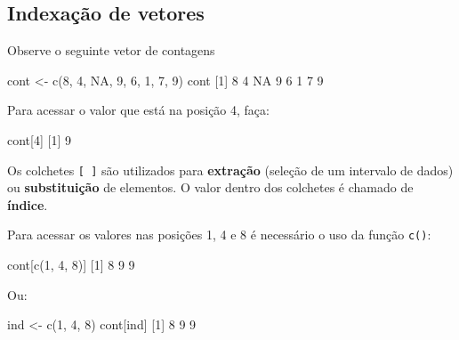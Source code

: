 \documentclass[
  10pt,
  a4paper]{book}
\newenvironment{Shaded}{\begin{snugshade}}{\end{snugshade}}
\newcommand{\ConstantTok}[1]{\textcolor[rgb]{0.00,0.00,0.00}{#1}}
\newcommand{\DecValTok}[1]{\textcolor[rgb]{0.00,0.00,0.81}{#1}}
\newcommand{\FunctionTok}[1]{\textcolor[rgb]{0.00,0.00,0.00}{#1}}
\newcommand{\NormalTok}[1]{#1}
\newcommand{\OtherTok}[1]{\textcolor[rgb]{0.56,0.35,0.01}{#1}}
\begin{document}
\hypertarget{indexauxe7uxe3o-de-vetores}{%
\subsection{Indexação de vetores}\label{indexauxe7uxe3o-de-vetores}}

Observe o seguinte vetor de contagens

\begin{Shaded}
\begin{Highlighting}[]
\NormalTok{cont }\OtherTok{\textless{}{-}} \FunctionTok{c}\NormalTok{(}\DecValTok{8}\NormalTok{, }\DecValTok{4}\NormalTok{, }\ConstantTok{NA}\NormalTok{, }\DecValTok{9}\NormalTok{, }\DecValTok{6}\NormalTok{, }\DecValTok{1}\NormalTok{, }\DecValTok{7}\NormalTok{, }\DecValTok{9}\NormalTok{)}
\NormalTok{cont}
\NormalTok{[}\DecValTok{1}\NormalTok{]  }\DecValTok{8}  \DecValTok{4} \ConstantTok{NA}  \DecValTok{9}  \DecValTok{6}  \DecValTok{1}  \DecValTok{7}  \DecValTok{9}
\end{Highlighting}
\end{Shaded}

Para acessar o valor que está na posição 4, faça:

\begin{Shaded}
\begin{Highlighting}[]
\NormalTok{cont[}\DecValTok{4}\NormalTok{]}
\NormalTok{[}\DecValTok{1}\NormalTok{] }\DecValTok{9}
\end{Highlighting}
\end{Shaded}

Os colchetes \texttt{{[}\ {]}} são utilizados para \textbf{extração} (seleção de um
intervalo de dados) ou \textbf{substituição} de elementos. O valor dentro
dos colchetes é chamado de \textbf{índice}.

Para acessar os valores nas posições 1, 4 e 8 é necessário o uso da
função \texttt{c()}:

\begin{Shaded}
\begin{Highlighting}[]
\NormalTok{cont[}\FunctionTok{c}\NormalTok{(}\DecValTok{1}\NormalTok{, }\DecValTok{4}\NormalTok{, }\DecValTok{8}\NormalTok{)]}
\NormalTok{[}\DecValTok{1}\NormalTok{] }\DecValTok{8} \DecValTok{9} \DecValTok{9}
\end{Highlighting}
\end{Shaded}

Ou:

\begin{Shaded}
\begin{Highlighting}[]
\NormalTok{ind }\OtherTok{\textless{}{-}} \FunctionTok{c}\NormalTok{(}\DecValTok{1}\NormalTok{, }\DecValTok{4}\NormalTok{, }\DecValTok{8}\NormalTok{)}
\NormalTok{cont[ind]}
\NormalTok{[}\DecValTok{1}\NormalTok{] }\DecValTok{8} \DecValTok{9} \DecValTok{9}
\end{Highlighting}
\end{Shaded}
\end{document}
